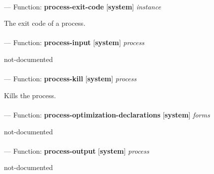 \paragraph{}
\label{SYSTEM:PROCESS-EXIT-CODE}
--- Function: \textbf{process-exit-code} [\textbf{system}] \textit{instance}

\begin{adjustwidth}{5em}{5em}
The exit code of a process.
\end{adjustwidth}

\paragraph{}
\label{SYSTEM:PROCESS-INPUT}
--- Function: \textbf{process-input} [\textbf{system}] \textit{process}

\begin{adjustwidth}{5em}{5em}
not-documented
\end{adjustwidth}

\paragraph{}
\label{SYSTEM:PROCESS-KILL}
--- Function: \textbf{process-kill} [\textbf{system}] \textit{process}

\begin{adjustwidth}{5em}{5em}
Kills the process.
\end{adjustwidth}

\paragraph{}
\label{SYSTEM:PROCESS-OPTIMIZATION-DECLARATIONS}
--- Function: \textbf{process-optimization-declarations} [\textbf{system}] \textit{forms}

\begin{adjustwidth}{5em}{5em}
not-documented
\end{adjustwidth}

\paragraph{}
\label{SYSTEM:PROCESS-OUTPUT}
--- Function: \textbf{process-output} [\textbf{system}] \textit{process}

\begin{adjustwidth}{5em}{5em}
not-documented
\end{adjustwidth}

